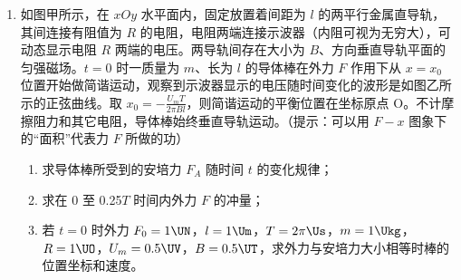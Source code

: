 \documentclass[\gkver]{gaokaozhenti}
\begin{document}
\begin{enumerate}
\item
如图甲所示，在 $xOy$ 水平面内，固定放置着间距为 $l$ 的两平行金属直导轨，其间连接有阻值为 $R$ 的电阻，电阻两端连接示波器（内阻可视为无穷大），可动态显示电阻 $R$ 两端的电压。两导轨间存在大小为 $B$、方向垂直导轨平面的匀强磁场。$t=0$ 时一质量为 $m$、长为 $l$ 的导体棒在外力 $F$ 作用下从 $x=x_{0}$ 位置开始做简谐运动，观察到示波器显示的电压随时间变化的波形是如图乙所示的正弦曲线。取 $x_{0}=-\frac{U_{m}T}{2\pi Bl}$，则简谐运动的平衡位置在坐标原点 O。不计摩擦阻力和其它电阻，导体棒始终垂直导轨运动。（提示：可以用 $F-x$ 图象下的“面积”代表力 $F$ 所做的功）
\begin{enumerate}
	\item
	求导体棒所受到的安培力 $F_{A}$ 随时间 $t$ 的变化规律；
	\item
	求在 0 至 0.25$T$ 时间内外力 $F$ 的冲量；
	\item
	若 $t=0$ 时外力 $F_{0}=1\UN$，$l=1\Um$，$T=2\pi\Us$，$m=1\Ukg$，$R=1\UO$，$U_{m}=0.5\UV$，$B=0.5\UT$，求外力与安培力大小相等时棒的位置坐标和速度。
\end{enumerate}
\end{enumerate}
\end{document}
